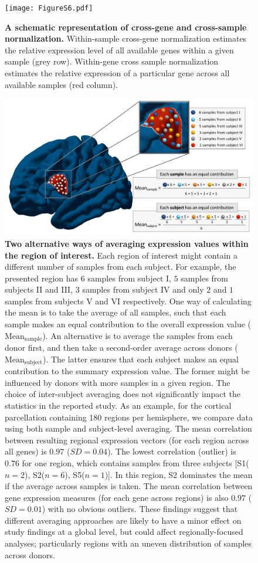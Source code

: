 \documentclass[10pt,A4]{article}
\begin{document}
\begin{figure}[h!]
  \centering
    \texttt{[image: FigureS6.pdf]}
\caption{\textbf{A schematic representation of cross-gene and cross-sample normalization.} Within-sample cross-gene normalization estimates the relative expression level of all available genes within a given sample (grey row). Within-gene cross sample normalization estimates the relative expression of a particular gene across all available samples (red column).}
\label{fig:Ch4Sfig6}
\end{figure}

\begin{figure}[h!]
  \centering
    \includegraphics[width=1\textwidth]{FigureS7.pdf}
\caption{\textbf{Two alternative ways of averaging expression values within the region of interest. }
Each region of interest might contain a different number of samples from each subject. For example, the presented region has $6$ samples from subject I, $5$ samples from subjects II and III, $3$ samples from subject IV and only $2$ and $1$ samples from subjects V and VI respectively. One way of calculating the mean is to take the average of all samples, such that each sample makes an equal contribution to the overall expression value ($\mathrm{Mean_{sample}}$). An alternative is to average the samples from each donor first, and then take a second-order average across donors ($\mathrm{Mean_{subject}}$). The latter ensures that each subject makes an equal contribution to the summary expression value. The former might be influenced by donors with more samples in a given region. The choice of inter-subject averaging does not significantly impact the statistics in the reported study. As an example, for the cortical parcellation containing 180 regions per hemisphere, we compare data using both sample and subject-level averaging. The mean correlation between resulting regional expression vectors (for each region across all genes) is $0.97$ ($SD = 0.04$). The lowest correlation (outlier) is $0.76$ for one region, which contains samples from three subjects [S1($n=2$), S2($n=6$), S5($n=1$)]. In this region, S2 dominates the mean if the average across samples is taken. The mean correlation between gene expression measures (for each gene across regions) is also $0.97$ ($SD = 0.01$) with no obvious outliers. These findings suggest that different averaging approaches are likely to have a minor effect on study findings at a global level, but could affect regionally-focused analyses; particularly regions with an uneven distribution of samples across donors.}

\end{figure}
\end{document}
